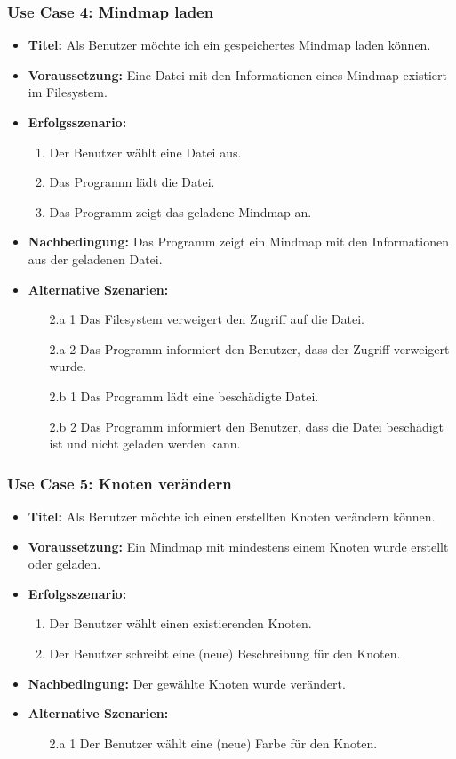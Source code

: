 \subsubsection{Use Case 4: Mindmap laden}
\begin{itemize}
\item \textbf{Titel:} Als Benutzer möchte ich ein gespeichertes Mindmap laden können.
\item \textbf{Voraussetzung:} Eine Datei mit den Informationen eines Mindmap existiert im Filesystem.
\item \textbf{Erfolgsszenario:}
	\begin{enumerate}
	\item Der Benutzer wählt eine Datei aus.
	\item Das Programm lädt die Datei.
	\item Das Programm zeigt das geladene Mindmap an.
	\end{enumerate}
\item \textbf{Nachbedingung:} Das Programm zeigt ein Mindmap mit den Informationen aus der geladenen Datei.
\item \textbf{Alternative Szenarien:}
	\begin{enumerate}
	\item [2.a 1] Das Filesystem verweigert den Zugriff auf die Datei.
	\item [2.a 2] Das Programm informiert den Benutzer, dass der Zugriff verweigert wurde.
	\item []
	\item [2.b 1] Das Programm lädt eine beschädigte Datei.
	\item [2.b 2] Das Programm informiert den Benutzer, dass die Datei beschädigt ist und nicht geladen werden kann.
	\end{enumerate}
\end{itemize}

\subsubsection{Use Case 5: Knoten verändern}
\begin{itemize}
\item \textbf{Titel:} Als Benutzer möchte ich einen erstellten Knoten verändern können.
\item \textbf{Voraussetzung:} Ein Mindmap mit mindestens einem Knoten wurde erstellt oder geladen.
\item \textbf{Erfolgsszenario:}
	\begin{enumerate}
	\item Der Benutzer wählt einen existierenden Knoten.
	\item Der Benutzer schreibt eine (neue) Beschreibung für den Knoten.
	\end{enumerate}
\item \textbf{Nachbedingung:} Der gewählte Knoten wurde verändert.
\item \textbf{Alternative Szenarien:}
	\begin{enumerate}
	\item [2.a 1] Der Benutzer wählt eine (neue) Farbe für den Knoten.
	\end{enumerate}
\end{itemize}

